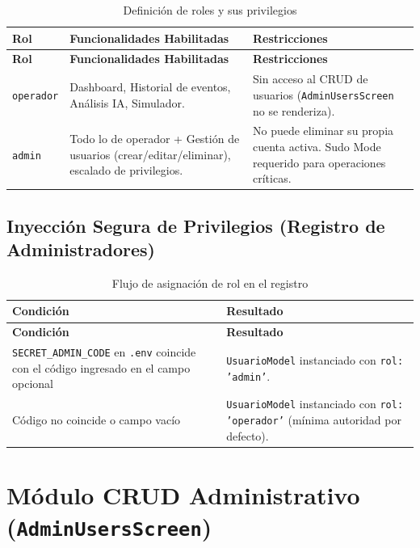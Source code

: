 \documentclass[12pt,a4paper]{article}
\begin{document}
\begin{longtable}{p{3cm} p{5.5cm} p{5cm}}
\caption{Definición de roles y sus privilegios} \label{tab:rbac} \\
\toprule
\textbf{Rol} & \textbf{Funcionalidades Habilitadas} & \textbf{Restricciones} \\
\midrule
\endfirsthead
\toprule
\textbf{Rol} & \textbf{Funcionalidades Habilitadas} & \textbf{Restricciones} \\
\midrule
\endhead
\bottomrule
\endlastfoot
\texttt{operador} &
  Dashboard, Historial de eventos, Análisis IA, Simulador. &
  Sin acceso al CRUD de usuarios (\texttt{AdminUsersScreen} no se renderiza). \\[0.3em]
\texttt{admin} &
  Todo lo de operador + Gestión de usuarios (crear/editar/eliminar), escalado de privilegios. &
  No puede eliminar su propia cuenta activa. Sudo Mode requerido para operaciones críticas. \\
\end{longtable}

\subsection{Inyección Segura de Privilegios (Registro de Administradores)}

\begin{longtable}{p{4.5cm} p{9cm}}
\caption{Flujo de asignación de rol en el registro} \label{tab:asignacion-rol} \\
\toprule
\textbf{Condición} & \textbf{Resultado} \\
\midrule
\endfirsthead
\toprule
\textbf{Condición} & \textbf{Resultado} \\
\midrule
\endhead
\bottomrule
\endlastfoot
\texttt{SECRET\_ADMIN\_CODE} en \texttt{.env} coincide con el código ingresado en el campo opcional &
  \texttt{UsuarioModel} instanciado con \texttt{rol: 'admin'}. \\
Código no coincide o campo vacío &
  \texttt{UsuarioModel} instanciado con \texttt{rol: 'operador'} (mínima autoridad por defecto). \\
\end{longtable}

\section{Módulo CRUD Administrativo (\texttt{AdminUsersScreen})}
\end{document}
